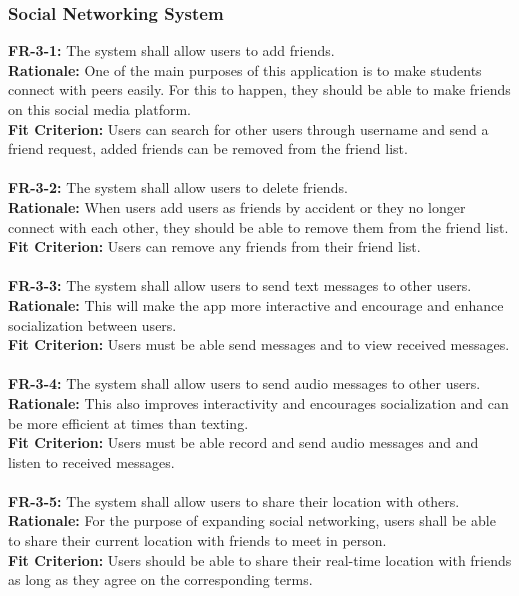 \documentclass[12pt]{article}
\begin{document}
\subsubsection{Social Networking System}
    \textbf{FR-3-1:} The system shall allow users to add friends.\\
    \textbf{Rationale:} One of the main purposes of this application is to make students connect with peers easily. For this to happen, they should be able to make friends on this social media platform.\\
    \textbf{Fit Criterion:} Users can search for other users through username and send a friend request, added friends can be removed from the friend list.\\\\
    \textbf{FR-3-2:} The system shall allow users to delete friends.\\
    \textbf{Rationale:} When users add users as friends by accident or they no longer connect with each other, they should be able to remove them from the friend list.\\
    \textbf{Fit Criterion:} Users can remove any friends from their friend list.\\\\
    \textbf{FR-3-3:} The system shall allow users to send text messages to other users.\\
    \textbf{Rationale:} This will make the app more interactive and encourage and enhance socialization between users.\\
    \textbf{Fit Criterion:} Users must be able send messages and to view received messages.\\\\
    \textbf{FR-3-4:} The system shall allow users to send audio messages to other users.\\
    \textbf{Rationale:} This also improves interactivity and encourages socialization and can be more efficient at times than texting.\\
    \textbf{Fit Criterion:} Users must be able record and send audio messages and and listen to received messages.\\\\
    \textbf{FR-3-5:} The system shall allow users to share their location with others.\\
    \textbf{Rationale:} For the purpose of expanding social networking, users shall be able to share their current location with friends to meet in person.\\
    \textbf{Fit Criterion:} Users should be able to share their real-time location with friends as long as they agree on the corresponding terms.\\\\
\end{document}

